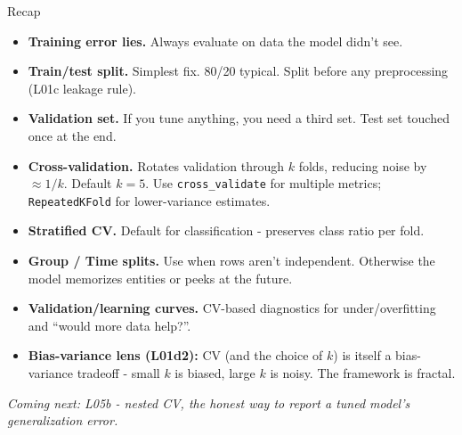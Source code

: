 \documentclass[aspectratio=169]{beamer}
\begin{document}
\begin{frame}{Recap}
  \begin{itemize}\small
    \item \textbf{Training error lies.} Always evaluate on data the model didn't see.
    \item \textbf{Train/test split.} Simplest fix. 80/20 typical. Split before any preprocessing (L01c leakage rule).
    \item \textbf{Validation set.} If you tune anything, you need a third set. Test set touched once at the end.
    \item \textbf{Cross-validation.} Rotates validation through $k$ folds, reducing noise by $\approx 1/k$. Default $k=5$. Use \texttt{cross\_validate} for multiple metrics; \texttt{RepeatedKFold} for lower-variance estimates.
    \item \textbf{Stratified CV.} Default for classification - preserves class ratio per fold.
    \item \textbf{Group / Time splits.} Use when rows aren't independent. Otherwise the model memorizes entities or peeks at the future.
    \item \textbf{Validation/learning curves.} CV-based diagnostics for under/overfitting and ``would more data help?''.
    \item \textbf{Bias-variance lens (L01d2):} CV (and the choice of $k$) is itself a bias-variance tradeoff - small $k$ is biased, large $k$ is noisy. The framework is fractal.
  \end{itemize}
  \vfill
  \emph{Coming next: L05b - nested CV, the honest way to report a tuned model's generalization error.}
\end{frame}
\end{document}
